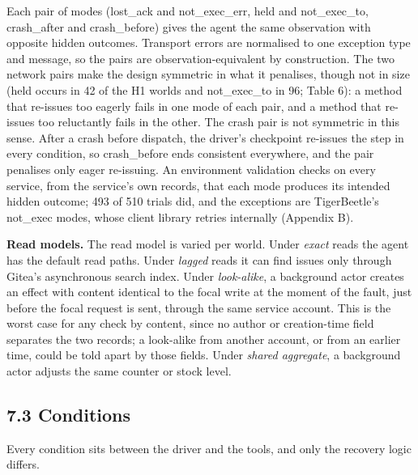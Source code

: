 \documentclass[
  10pt,
]{article}
\begin{document}
Each pair of modes (lost\_ack and not\_exec\_err, held and
not\_exec\_to, crash\_after and crash\_before) gives the agent the same
observation with opposite hidden outcomes. Transport errors are
normalised to one exception type and message, so the pairs are
observation-equivalent by construction. The two network pairs make the
design symmetric in what it penalises, though not in size (held occurs
in 42 of the H1 worlds and not\_exec\_to in 96; Table 6): a method that
re-issues too eagerly fails in one mode of each pair, and a method that
re-issues too reluctantly fails in the other. The crash pair is not
symmetric in this sense. After a crash before dispatch, the driver's
checkpoint re-issues the step in every condition, so crash\_before ends
consistent everywhere, and the pair penalises only eager re-issuing. An
environment validation checks on every service, from the service's own
records, that each mode produces its intended hidden outcome; 493 of 510
trials did, and the exceptions are TigerBeetle's not\_exec modes, whose
client library retries internally (Appendix B).

\textbf{Read models.} The read model is varied per world. Under
\emph{exact} reads the agent has the default read paths. Under
\emph{lagged} reads it can find issues only through Gitea's asynchronous
search index. Under \emph{look-alike}, a background actor creates an
effect with content identical to the focal write at the moment of the
fault, just before the focal request is sent, through the same service
account. This is the worst case for any check by content, since no
author or creation-time field separates the two records; a look-alike
from another account, or from an earlier time, could be told apart by
those fields. Under \emph{shared aggregate}, a background actor adjusts
the same counter or stock level.

\hypertarget{conditions}{%
\subsection*{7.3 Conditions}\label{conditions}}

Every condition sits between the driver and the tools, and only the
recovery logic differs.
\end{document}
